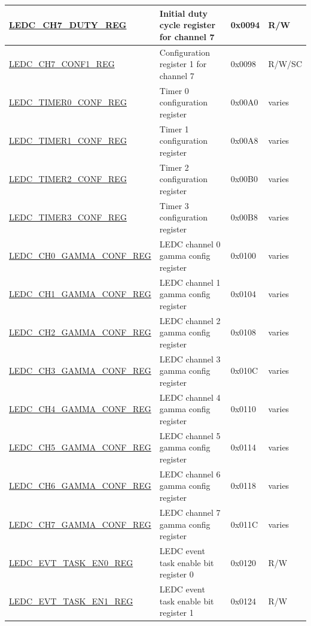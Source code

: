 \begin{longtable}{ | p{6cm} | p{7cm} | p{1.3cm} | p{1.7cm}| }
\hyperref[regdesc:LEDCCHNDUTYREG]{LEDC\_CH7\_DUTY\_REG} & Initial duty cycle register for channel 7 & 0x0094 & R/W \\ \hline
\hyperref[regdesc:LEDCCHNCONF1REG]{LEDC\_CH7\_CONF1\_REG} & Configuration register 1 for channel 7 & 0x0098 & R/W/SC \\ \hline
\hyperref[regdesc:LEDCTIMERXCONFREG]{LEDC\_TIMER0\_CONF\_REG} & Timer 0 configuration register & 0x00A0 & varies \\ \hline
\hyperref[regdesc:LEDCTIMERXCONFREG]{LEDC\_TIMER1\_CONF\_REG} & Timer 1 configuration register & 0x00A8 & varies \\ \hline
\hyperref[regdesc:LEDCTIMERXCONFREG]{LEDC\_TIMER2\_CONF\_REG} & Timer 2 configuration register & 0x00B0 & varies \\ \hline
\hyperref[regdesc:LEDCTIMERXCONFREG]{LEDC\_TIMER3\_CONF\_REG} & Timer 3 configuration register & 0x00B8 & varies \\ \hline
\hyperref[regdesc:LEDCCHNGAMMACONFREG]{LEDC\_CH0\_GAMMA\_CONF\_REG} & LEDC channel 0 gamma config register & 0x0100 & varies \\ \hline
\hyperref[regdesc:LEDCCHNGAMMACONFREG]{LEDC\_CH1\_GAMMA\_CONF\_REG} & LEDC channel 1 gamma config register & 0x0104 & varies \\ \hline
\hyperref[regdesc:LEDCCHNGAMMACONFREG]{LEDC\_CH2\_GAMMA\_CONF\_REG} & LEDC channel 2 gamma config register & 0x0108 & varies \\ \hline
\hyperref[regdesc:LEDCCHNGAMMACONFREG]{LEDC\_CH3\_GAMMA\_CONF\_REG} & LEDC channel 3 gamma config register & 0x010C & varies \\ \hline
\hyperref[regdesc:LEDCCHNGAMMACONFREG]{LEDC\_CH4\_GAMMA\_CONF\_REG} & LEDC channel 4 gamma config register & 0x0110 & varies \\ \hline
\hyperref[regdesc:LEDCCHNGAMMACONFREG]{LEDC\_CH5\_GAMMA\_CONF\_REG} & LEDC channel 5 gamma config register & 0x0114 & varies \\ \hline
\hyperref[regdesc:LEDCCHNGAMMACONFREG]{LEDC\_CH6\_GAMMA\_CONF\_REG} & LEDC channel 6 gamma config register & 0x0118 & varies \\ \hline
\hyperref[regdesc:LEDCCHNGAMMACONFREG]{LEDC\_CH7\_GAMMA\_CONF\_REG} & LEDC channel 7 gamma config register & 0x011C & varies \\ \hline
\hyperref[regdesc:LEDCEVTTASKEN0REG]{LEDC\_EVT\_TASK\_EN0\_REG} & LEDC event task enable bit register 0 & 0x0120 & R/W \\ \hline
\hyperref[regdesc:LEDCEVTTASKEN1REG]{LEDC\_EVT\_TASK\_EN1\_REG} & LEDC event task enable bit register 1 & 0x0124 & R/W \\ \hline

\end{longtable}

